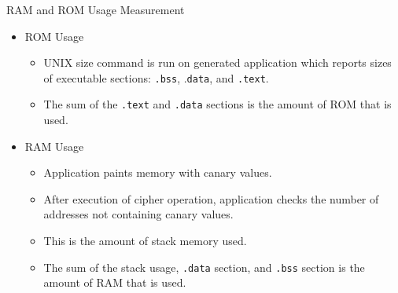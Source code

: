 \documentclass[xcolor=pdftex,dvipsnames,table,final]{beamer}
\begin{document}
\begin{frame}[fragile]{}
\begin{columns}[t, totalwidth=\textwidth]
\begin{column}{.675\linewidth}
\begin{columns}
\begin{column}{.473\linewidth}
      \begin{block}{RAM and ROM Usage Measurement}
        \begin{itemize}
          \item ROM Usage
            \begin{itemize}
              \item UNIX size command is run on generated application which
                    reports sizes of executable sections: \texttt{.bss}, .\texttt{data}, and \texttt{.text}.
              \item The sum of the \texttt{.text} and \texttt{.data} sections is the amount of ROM that is used.
            \end{itemize}
          \item RAM Usage
            \begin{itemize}
              \item Application paints memory with canary values.
              \item After execution of cipher operation, application checks
                    the number of addresses not containing canary values.
              \item This is the amount of stack memory used.
              \item The sum of the stack usage, \texttt{.data} section, and \texttt{.bss} section is the amount of RAM that is used.
            \end{itemize}
          
        \end{itemize}

      \end{block}


\end{column}
\end{columns}
\end{column}
\end{columns}
\end{frame}
\end{document}
